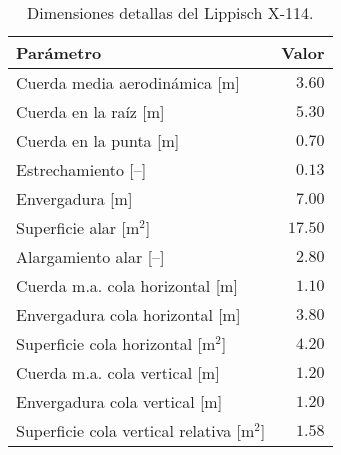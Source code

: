 




\begin{table}[ht]
\centering
\caption{Dimensiones detallas del Lippisch X-114.}
\label{tab:x114dim}
\begin{tabular}{lr}
\toprule
Parámetro                                   & Valor       \\ \midrule
Cuerda media aerodinámica [m]               & $3.60$      \\
Cuerda en la raíz [m]                       & $5.30$      \\
Cuerda en la punta [m]                      & $0.70$      \\
Estrechamiento [–]                          & $0.13$      \\
Envergadura [m]                             & $7.00$      \\
Superficie alar [m$^2$]                     & $17.50$     \\
Alargamiento alar [–]                       & $2.80$      \\ \midrule
Cuerda m.a. cola horizontal [m]             & $1.10$      \\
Envergadura cola horizontal [m]             & $3.80$      \\
Superficie cola horizontal [m$^2$]          & $4.20$      \\ \midrule
Cuerda m.a. cola vertical [m]               & $1.20$      \\
Envergadura cola vertical [m]               & $1.20$      \\
Superficie cola vertical relativa [m$^2$]   & $1.58$      \\ \bottomrule
\end{tabular}
\end{table}





